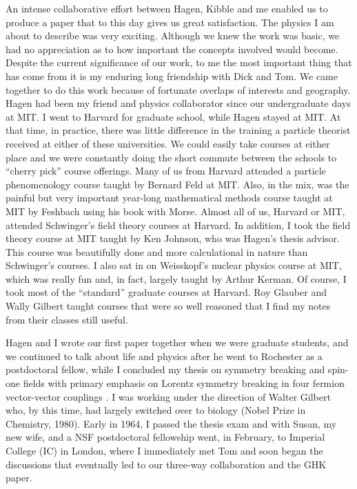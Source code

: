 \documentclass[12pt]{article}
\begin{document}
An intense collaborative effort between Hagen, Kibble and me enabled
us to produce a paper that to this day gives us great
satisfaction. The physics I am about to describe was very exciting.
Although we knew the work was basic, we had no appreciation as to how
important the concepts involved would become.  Despite the current
significance of our work, to me the most important thing that has come
from it is my enduring long friendship with Dick and Tom. We came
together to do this work because of fortunate overlaps of interests
and geography. Hagen had been my friend and physics collaborator since
our undergraduate days at MIT.  I went to Harvard for graduate school,
while Hagen stayed at MIT. At that time, in practice, there was little
difference in the training a particle theorist received at either of
these universities. We could easily take courses at either place and
we were constantly doing the short commute between the schools to
``cherry pick'' course offerings. Many of us from Harvard attended a
particle phenomenology course taught by Bernard Feld at MIT. Also, in
the mix, was the painful but very important year-long mathematical
methods course taught at MIT by Feshbach using his book with
Morse. Almost all of us, Harvard or MIT, attended Schwinger's field
theory courses at Harvard. In addition, I took the field theory course
at MIT taught by Ken Johnson, who was Hagen's thesis advisor. This
course was beautifully done and more calculational in nature than
Schwinger's courses. I also sat in on Weisskopf's nuclear physics
course at MIT, which was really fun and, in fact, largely taught by
Arthur Kerman. Of course, I took most of the ``standard'' graduate
courses at Harvard.  Roy Glauber and Wally Gilbert taught courses that
were so well reasoned that I find my notes from their classes still
useful.

Hagen and I wrote our first paper \cite{gh1;1963}
together when we were graduate students, and we continued to talk about life and physics after he went
to Rochester as a postdoctoral fellow, while I concluded my thesis on
symmetry breaking and spin-one fields with primary emphasis on Lorentz
symmetry breaking in four fermion vector-vector couplings \cite{ggff1;194,ggff2;1964}. I was
working under the direction of Walter Gilbert who, by this time, had
largely switched over to biology (Nobel Prize in Chemistry, 1980). Early in 1964, I passed the thesis
exam and with Susan, my new wife, and  a NSF postdoctoral fellowship went, in February, to
Imperial College (IC) in London, where I immediately met Tom and soon began the
discussions that eventually led to our three-way collaboration and
the GHK paper.
\end{document}
